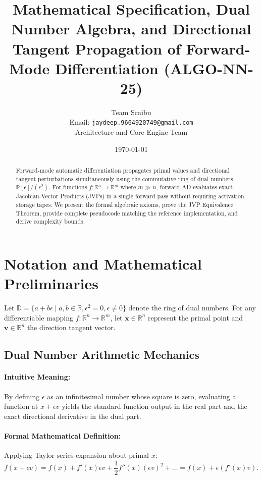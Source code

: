 \documentclass[11pt]{article}
\title{\textbf{Mathematical Specification, Dual Number Algebra, and Directional Tangent Propagation of Forward-Mode Differentiation (ALGO-NN-25)}}
\author{Team Scaibu \\ \small Email: \texttt{jaydeep.9664920749@gmail.com} \\ \small Architecture and Core Engine Team}
\date{\today}
\begin{document}
\maketitle

\begin{abstract}
Forward-mode automatic differentiation propagates primal values and directional tangent perturbations simultaneously using the commutative ring of dual numbers $\mathbb{R}[\epsilon]/(\epsilon^2)$. For functions $f: \mathbb{R}^n \to \mathbb{R}^m$ where $m \gg n$, forward AD evaluates exact Jacobian-Vector Products (JVPs) in a single forward pass without requiring activation storage tapes. We present the formal algebraic axioms, prove the JVP Equivalence Theorem, provide complete pseudocode matching the reference implementation, and derive complexity bounds.
\end{abstract}

\section{Notation and Mathematical Preliminaries}
\label{sec:notation}

Let $\mathbb{D} = \{a + b\epsilon \mid a, b \in \mathbb{R}, \epsilon^2 = 0, \epsilon \neq 0\}$ denote the ring of dual numbers. For any differentiable mapping $f: \mathbb{R}^n \to \mathbb{R}^m$, let $\mathbf{x} \in \mathbb{R}^n$ represent the primal point and $\mathbf{v} \in \mathbb{R}^n$ the direction tangent vector.

\subsection{Dual Number Arithmetic Mechanics}
\paragraph{Intuitive Meaning:} By defining $\epsilon$ as an infinitesimal number whose square is zero, evaluating a function at $x + \epsilon v$ yields the standard function output in the real part and the exact directional derivative in the dual part.

\paragraph{Formal Mathematical Definition:}
Applying Taylor series expansion about primal $x$:
\begin{equation}
\label{eq:dual_taylor}
f(x + \epsilon v) = f(x) + f'(x) \epsilon v + \frac{1}{2} f''(x) (\epsilon v)^2 + \dots = f(x) + \epsilon (f'(x) v).
\end{equation}
\end{document}
